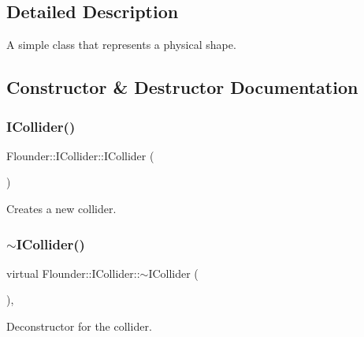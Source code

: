 \subsection{Detailed Description}
A simple class that represents a physical shape. 



\subsection{Constructor \& Destructor Documentation}
\mbox{\label{class_flounder_1_1_i_collider_a59d35edf3457f1f0bfd87fe858a07fd8}} 
\subsubsection{\texorpdfstring{I\+Collider()}{ICollider()}}
{\footnotesize\ttfamily Flounder\+::\+I\+Collider\+::\+I\+Collider (\begin{DoxyParamCaption}{ }\end{DoxyParamCaption})\hspace{0.3cm}{\ttfamily [inline]}}



Creates a new collider. 

\mbox{\label{class_flounder_1_1_i_collider_a4f2b3bd9e22b1b74391068daa0b3a038}} 
\subsubsection{\texorpdfstring{$\sim$\+I\+Collider()}{~ICollider()}}
{\footnotesize\ttfamily virtual Flounder\+::\+I\+Collider\+::$\sim$\+I\+Collider (\begin{DoxyParamCaption}{ }\end{DoxyParamCaption})\hspace{0.3cm}{\ttfamily [inline]}, {\ttfamily [virtual]}}



Deconstructor for the collider. 



